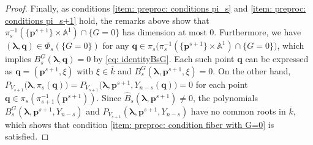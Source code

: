 \documentclass[pdflatex,sn-basic]{sn-jnl}%
\theoremstyle{thmstyleone}%
\theoremstyle{thmstyletwo}%
\theoremstyle{thmstylethree}%
\theoremstyle{definition}
\numberwithin{equation}{section}
\newcommand{\bfs}{\boldsymbol}
\newcommand{\A}{\mathbb A}
\newcommand{\ck}{\overline{k}}
\begin{document}
\begin{proof}
Finally, as
conditions \eqref{item: preproc: conditions pi_s} and \eqref{item:
preproc: conditions pi_s+1} hold, the remarks above show that
$\pi_s^{-1}(\{\bfs p^{s+1}\}\times \A^1)\cap\{G=0\}$ has dimension at
most 0. Furthermore, we have $(\bfs\lambda,\bfs q)\in
\Phi_s(\{G=0\})$ for any $\bfs q\in\pi_s\big(\pi_s^{-1}(\{\bfs
p^{s+1}\}\times \A^1)\cap\{G=0\}\big)$, which implies
$B_s^G(\bfs\lambda,\bfs q)=0$ by \eqref{eq: identityBsG}. Each such point $\bfs q$ can be
expressed as $\bfs q=(\bfs p^{s+1},\xi)$ with $\xi\in\ck$ and
$B_s^G(\bfs\lambda,\bfs p^{s+1},\xi)=0$. On the other hand,
$P_{V_{s+1}}\big(\bfs\lambda,\pi_s(\bfs
q)\big)=P_{V_{s+1}}\big(\bfs\lambda,\bfs p^{s+1},Y_{n-s}(\bfs q)\big)=0$
for each point $\bfs q\in\pi_s(\pi_{s+1}^{-1}(\bfs p^{s+1}))$. Since
$\widehat{B}_s(\bfs\lambda,\bfs p^{s+1})\not=0$, the polynomials
$B_s^G(\bfs\lambda,\bfs p^{s+1},Y_{n-s})$ and
$P_{V_{s+1}}(\bfs\lambda,\bfs p^{s+1},Y_{n-s})$ have no common roots in
$\ck$, which shows that condition \eqref{item: preproc: condition
fiber with G=0} is satisfied.
\end{proof}
\end{document}
